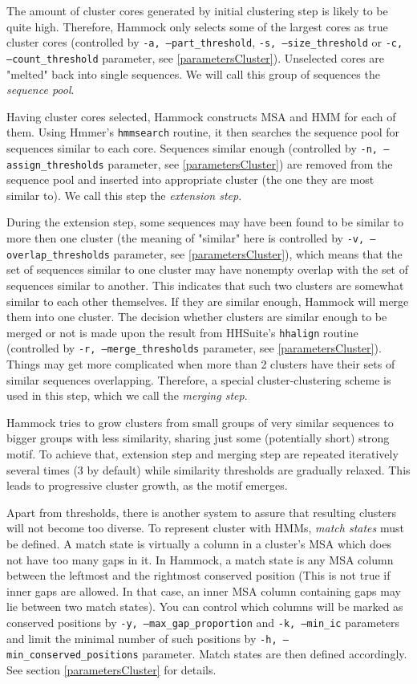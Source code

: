 \documentclass[11pt, a4paper, twoside, titlepage]{article}
\begin{document}
The amount of cluster cores generated by initial clustering step is likely to be quite high. Therefore, Hammock only selects some of the largest cores as true cluster cores (controlled by \texttt{-a, --part\_threshold}, \texttt{-s, --size\_threshold} or \texttt{-c, --count\_threshold} parameter, see \ref{parametersCluster}). Unselected cores are "melted" back into single sequences. We will call this group of sequences the \emph{sequence pool}.

Having cluster cores selected, Hammock constructs MSA and HMM for each of them. Using Hmmer's \texttt{hmmsearch} routine, it then searches the sequence pool for sequences similar to each core. Sequences similar enough (controlled by \texttt{-n, --assign\_thresholds} parameter, see \ref{parametersCluster}) are removed from the sequence pool and inserted into appropriate cluster (the one they are most similar to). We call this step the \emph{extension step}.

During the extension step, some sequences may have been found to be similar to more then one cluster (the meaning of "similar" here is controlled by \texttt{-v, --overlap\_thresholds} parameter, see \ref{parametersCluster}), which means that the set of sequences similar to one cluster may have nonempty overlap with the set of sequences similar to another. This indicates that such two clusters are somewhat similar to each other themselves. If they are similar enough, Hammock will merge them into one cluster. The decision whether clusters are similar enough to be merged or not is made upon the result from HHSuite's \texttt{hhalign} routine (controlled by \texttt{-r, --merge\_thresholds} parameter, see \ref{parametersCluster}). Things may get more complicated when more than 2 clusters have their sets of similar sequences overlapping. Therefore, a special cluster-clustering scheme is used in this step, which we call the \emph{merging step}. \newline

Hammock tries to grow clusters from small groups of very similar sequences to bigger groups with less similarity, sharing just some (potentially short) strong motif. To achieve that, extension step and merging step are repeated iteratively several times (3 by default) while similarity thresholds are gradually relaxed. This leads to progressive cluster growth, as the motif emerges.

Apart from thresholds, there is another system to assure that resulting clusters will not become too diverse. To represent cluster with HMMs, \textit{match states} must be defined. A match state is virtually a column in a cluster's MSA which does not have too many gaps in it. In Hammock, a match state is any MSA column between the leftmost and the rightmost conserved position (This is not true if inner gaps are allowed. In that case, an inner MSA column containing gaps may lie between two match states).  You can control which columns will be marked as conserved positions by \texttt{-y, --max\_gap\_proportion} and \texttt{-k, --min\_ic} parameters and limit the minimal number of such positions by \texttt{-h, --min\_conserved\_positions} parameter. Match states are then defined accordingly. See section \ref{parametersCluster} for details. 
\end{document}
